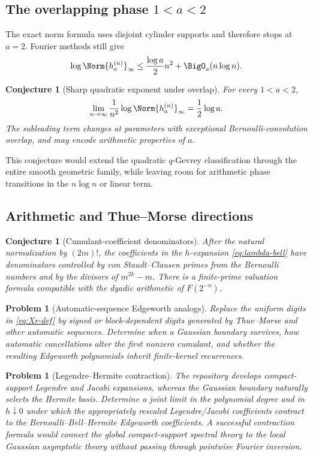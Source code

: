 \documentclass[11pt]{article}
\numberwithin{equation}{section}
\newtheorem{conjecture}[theorem]{Conjecture}
\newtheorem{problem}[theorem]{Problem}
\theoremstyle{definition}
\begin{document}
\subsection{The overlapping phase \texorpdfstring{$1<a<2$}{1<a<2}}
The exact norm formula uses disjoint cylinder supports and therefore stops at \(a=2\).  Fourier methods still give
\[
 \log\Norm{h_a^{(n)}}_\infty\le\frac{\log a}{2}n^2+\BigO_a(n\log n).
\]

\begin{conjecture}[Sharp quadratic exponent under overlap]\label{conj:overlap-growth}
For every \(1<a<2\),
\begin{equation}\label{eq:overlap-conj}
 \lim_{n\to\infty}\frac1{n^2}\log\Norm{h_a^{(n)}}_\infty
 =\frac12\log a.
\end{equation}
The subleading term changes at parameters with exceptional Bernoulli-convolution overlap, and may encode arithmetic properties of \(a\).
\end{conjecture}

This conjecture would extend the quadratic \(q\)-Gevrey classification through the entire smooth geometric family, while leaving room for arithmetic phase transitions in the \(n\log n\) or linear term.

\subsection{Arithmetic and Thue--Morse directions}
\begin{conjecture}[Cumulant-coefficient denominators]\label{conj:cumulant-denominators}
After the natural normalization by \((2m)!\), the coefficients in the \(h\)-expansion \eqref{eq:lambda-bell} have denominators controlled by von Staudt--Clausen primes from the Bernoulli numbers and by the divisors of \(m^{2k}-m\).  There is a finite-prime valuation formula compatible with the dyadic arithmetic of \(F(2^{-n})\).
\end{conjecture}

\begin{problem}[Automatic-sequence Edgeworth analogs]
Replace the uniform digits in \eqref{eq:Xr-def} by signed or block-dependent digits generated by Thue--Morse and other automatic sequences.  Determine when a Gaussian boundary survives, how automatic cancellations alter the first nonzero cumulant, and whether the resulting Edgeworth polynomials inherit finite-kernel recurrences.
\end{problem}

\begin{problem}[Legendre--Hermite contraction]
The repository develops compact-support Legendre and Jacobi expansions, whereas the Gaussian boundary naturally selects the Hermite basis.  Determine a joint limit in the polynomial degree and in \(h\downarrow0\) under which the appropriately rescaled Legendre/Jacobi coefficients contract to the Bernoulli--Bell--Hermite Edgeworth coefficients.  A successful contraction formula would connect the global compact-support spectral theory to the local Gaussian asymptotic theory without passing through pointwise Fourier inversion.
\end{problem}
\end{document}
